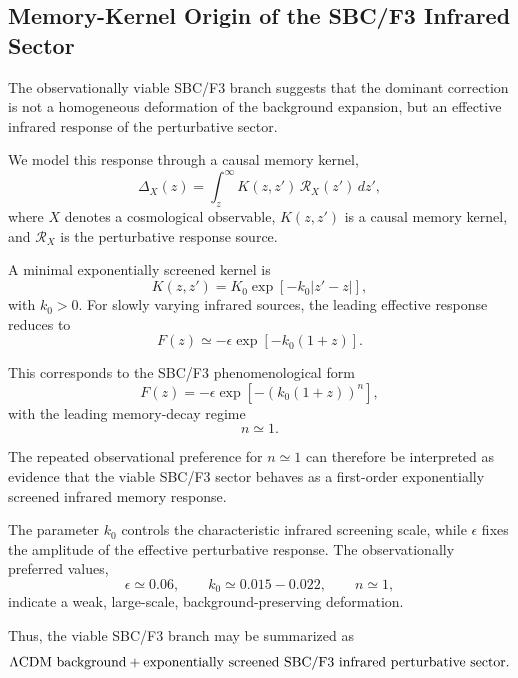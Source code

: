 \subsection{Memory-Kernel Origin of the SBC/F3 Infrared Sector}

The observationally viable SBC/F3 branch suggests that the dominant correction is not a homogeneous deformation of the background expansion, but an effective infrared response of the perturbative sector.

We model this response through a causal memory kernel,
\begin{equation}
\Delta_X(z)=\int_z^{\infty} K(z,z')\,\mathcal{R}_X(z')\,dz',
\end{equation}
where \(X\) denotes a cosmological observable, \(K(z,z')\) is a causal memory kernel, and \(\mathcal{R}_X\) is the perturbative response source.

A minimal exponentially screened kernel is
\begin{equation}
K(z,z') = K_0 \exp[-k_0 |z'-z|],
\end{equation}
with \(k_0>0\). For slowly varying infrared sources, the leading effective response reduces to
\begin{equation}
F(z)\simeq -\epsilon \exp[-k_0(1+z)].
\end{equation}

This corresponds to the SBC/F3 phenomenological form
\begin{equation}
F(z)= -\epsilon
\exp\left[-\left(k_0(1+z)\right)^n\right],
\end{equation}
with the leading memory-decay regime
\begin{equation}
n\simeq 1.
\end{equation}

The repeated observational preference for \(n\simeq 1\) can therefore be interpreted as evidence that the viable SBC/F3 sector behaves as a first-order exponentially screened infrared memory response.

The parameter \(k_0\) controls the characteristic infrared screening scale, while \(\epsilon\) fixes the amplitude of the effective perturbative response. The observationally preferred values,
\begin{equation}
\epsilon\simeq 0.06,\qquad
k_0\simeq 0.015-0.022,\qquad
n\simeq 1,
\end{equation}
indicate a weak, large-scale, background-preserving deformation.

Thus, the viable SBC/F3 branch may be summarized as
\begin{equation}
\Lambda{\rm CDM\ background}
+
{\rm exponentially\ screened\ SBC/F3\ infrared\ perturbative\ sector}.
\end{equation}
